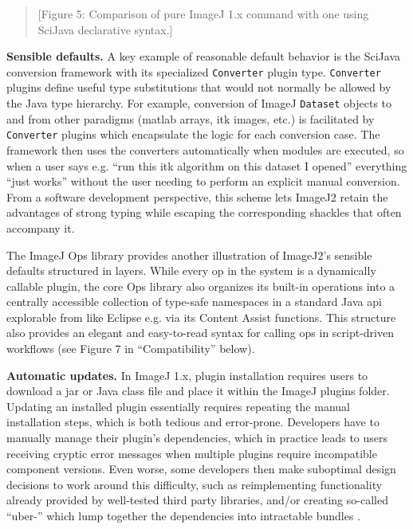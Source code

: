 \documentclass{bmcart}
\begin{document}
\begin{quote}
[Figure 5: Comparison of pure ImageJ 1.x command with one using SciJava
declarative syntax.]
\end{quote}

\textbf{Sensible defaults.} A key example of reasonable default behavior is the
SciJava conversion framework with its specialized \texttt{Converter} plugin
type. \texttt{Converter} plugins define useful type substitutions that would
not normally be allowed by the Java type hierarchy. For example, conversion of
ImageJ \texttt{Dataset} objects to and from other paradigms (\acrshort{matlab}
arrays, \acrshort{itk} images, etc.) is facilitated by \texttt{Converter}
plugins which encapsulate the logic for each conversion case. The framework
then uses the converters automatically when modules are executed, so when a
user says e.g. ``run this \acrshort{itk} algorithm on this dataset I opened''
everything ``just works'' without the user needing to perform an explicit
manual conversion. From a software development perspective, this scheme lets
ImageJ2 retain the advantages of strong typing while escaping the corresponding
shackles that often accompany it.

The ImageJ Ops library provides another illustration of ImageJ2's sensible
defaults structured in layers. While every op in the system is a dynamically
callable plugin, the core Ops library also organizes its built-in operations
into a centrally accessible collection of type-safe namespaces in a standard
Java \acrshort{api} explorable from  like Eclipse e.g. via its
Content Assist functions. This structure also provides an elegant and
easy-to-read syntax for calling ops in script-driven workflows (see Figure 7 in
``Compatibility'' below).

\textbf{Automatic updates.} In ImageJ 1.x, plugin installation requires users
to download a \acrshort{jar} or Java class file and place it within the ImageJ
plugins folder. Updating an installed plugin essentially requires repeating the
manual installation steps, which is both tedious and error-prone. Developers
have to manually manage their plugin's dependencies, which in practice leads to
users receiving cryptic error messages when multiple plugins require
incompatible component versions. Even worse, some developers then make
suboptimal design decisions to work around this difficulty, such as
reimplementing functionality already provided by well-tested third party
libraries, and/or creating so-called ``uber-'' which lump
together the dependencies into intractable bundles \cite{imagej_uber_jar}.
\end{document}
